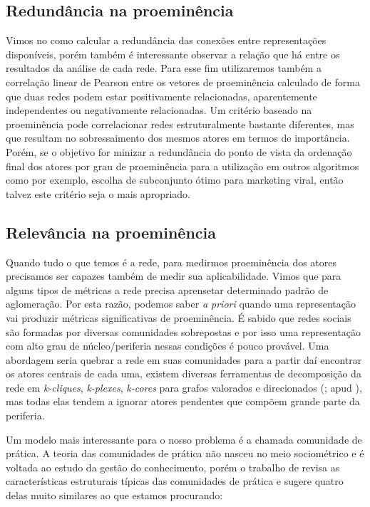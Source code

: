 \subsection{Redundância na proeminência}

Vimos no  como calcular a redundância das conexões entre
representações disponíveis, porém também é interessante observar a relação que há
entre os resultados da análise de cada rede. Para esse fim utilizaremos também a
correlação linear de Pearson entre os vetores de proeminência calculado de forma
que duas redes podem estar positivamente relacionadas, aparentemente
independentes ou negativamente relacionadas. Um critério baseado na proeminência
pode correlacionar redes estruturalmente bastante diferentes, mas que resultam no
sobressaimento dos mesmos atores em termos de importância. Porém, se o objetivo
for minizar a redundância do ponto de vista da ordenação final dos atores por
grau de proeminência para a utilização em outros algoritmos como por exemplo,
escolha de subconjunto ótimo para marketing viral, então talvez este critério
seja o mais apropriado.

\subsection{Relevância na proeminência}
\label{sec:rel_proe}

Quando tudo o que temos é a rede, para medirmos proeminência dos atores
precisamos ser capazes também de medir sua aplicabilidade. Vimos que para alguns
tipos de métricas a rede precisa aprensetar determinado padrão de aglomeração.
Por esta razão, podemos saber \emph{a priori} quando uma representação vai
produzir métricas significativas de proeminência. É sabido que redes sociais são
formadas por diversas comunidades sobrepostas \citep{Palla2005} e por isso uma
representação com alto grau de núcleo/periferia nessas condições é pouco
provável. Uma abordagem seria quebrar a rede em suas comunidades para a partir
daí encontrar os atores centrais de cada uma, existem diversas ferramentas de
decomposição da rede em \emph{k-cliques}, \emph{k-plexes}, \emph{k-cores} para
grafos valorados e direcionados (\citealt{Peay1975, Doreian1969, Freeman1992};
apud \citealt{Wasserman}), mas todas elas tendem a ignorar atores pendentes que
compõem grande parte da periferia.

Um modelo mais interessante para o nosso problema é a chamada comunidade de
prática. A teoria das comunidades de prática não nasceu no meio sociométrico e é
voltada ao estudo da gestão do conhecimento, porém o trabalho de
\citet{Schenkel2002} revisa as características estruturais típicas das
comunidades de prática e sugere quatro delas muito similares ao que estamos
procurando:

